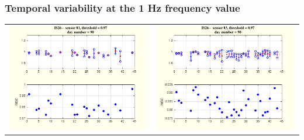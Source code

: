 \documentclass[handout,10pt]{beamer}
\begin{document}
%
%
%
%
%
\begin{frame}
\frametitle{Temporal variability at the 1 Hz frequency value}
\begin{tabular}{cc}
\includegraphics[scale=0.3]{evolutionon1atfreq1-eps-converted-to.pdf}
&
\includegraphics[scale=0.3]{evolutionon3atfreq1-eps-converted-to.pdf}

\end{tabular}
\end{frame}
\end{document}
